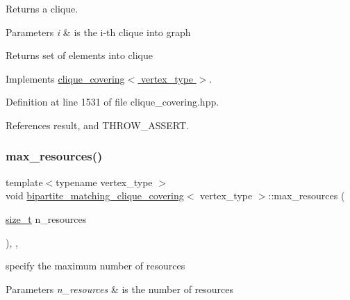 Returns a clique. 


\begin{DoxyParams}{Parameters}
{\em i} & is the i-\/th clique into graph \\
\hline
\end{DoxyParams}
\begin{DoxyReturn}{Returns}
set of elements into clique 
\end{DoxyReturn}


Implements \hyperlink{classclique__covering_ab0ac09e6c1be800358fb327728a07146}{clique\+\_\+covering$<$ vertex\+\_\+type $>$}.



Definition at line 1531 of file clique\+\_\+covering.\+hpp.



References result, and T\+H\+R\+O\+W\+\_\+\+A\+S\+S\+E\+RT.

\mbox{\label{classbipartite__matching__clique__covering_a94f457764eb9a86767f63a040b9dc2da}} 
\subsubsection{\texorpdfstring{max\+\_\+resources()}{max\_resources()}}
{\footnotesize\ttfamily template$<$typename vertex\+\_\+type $>$ \\
void \hyperlink{classbipartite__matching__clique__covering}{bipartite\+\_\+matching\+\_\+clique\+\_\+covering}$<$ vertex\+\_\+type $>$\+::max\+\_\+resources (\begin{DoxyParamCaption}\item[{\hyperlink{tutorial__fpt__2017_2intro_2sixth_2test_8c_a7c94ea6f8948649f8d181ae55911eeaf}{size\+\_\+t}}]{n\+\_\+resources }\end{DoxyParamCaption})\hspace{0.3cm}{\ttfamily [inline]}, {\ttfamily [override]}, {\ttfamily [virtual]}}



specify the maximum number of resources 


\begin{DoxyParams}{Parameters}
{\em n\+\_\+resources} & is the number of resources \\
\hline
\end{DoxyParams}


